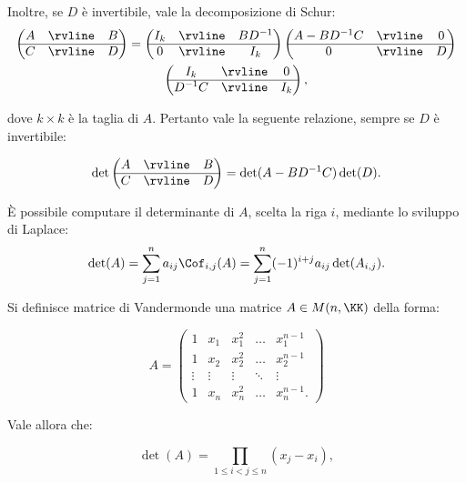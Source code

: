 \documentclass[10pt,landscape]{article}
\begin{document}
\begin{multicols}{3}
		Inoltre, se $D$ è invertibile, vale la decomposizione di Schur:
		\setlength{\extrarowheight}{1.3pt}
		\begin{gather*}
			\begin{pmatrix}
				A
				& \rvline & B \\
				\hline
				C & \rvline &
				D
			\end{pmatrix} = \begin{pmatrix}
				I_k
				& \rvline & BD^{-1} \\
				\hline
				0 & \rvline &
				I_k
			\end{pmatrix}
			\begin{pmatrix}
				A-BD^{-1}C
				& \rvline & 0 \\
				\hline
				0 & \rvline &
				D
			\end{pmatrix} \\
			\begin{pmatrix}
				I_k
				& \rvline & 0 \\
				\hline
				D^{-1}C & \rvline &
				I_k
			\end{pmatrix},
		\end{gather*}
		\setlength{\extrarowheight}{0pt}
		
		dove $k \times k$ è la taglia di $A$. Pertanto vale
		la seguente relazione, sempre se $D$ è invertibile:
		
		\[ \det \begin{pmatrix}
			A
			& \rvline & B \\
			\hline
			C & \rvline &
			D
		\end{pmatrix} = \det(A-BD^{-1}C)\det(D). \]
		
		È possibile computare il determinante di $A$, scelta la riga $i$, mediante lo
		sviluppo di Laplace:
		\[ \det(A) = \sum_{j=1}^n a_{ij} \Cof_{i,j}(A) = \sum_{j=1}^n (-1)^{i+j} a_{ij} \det(A_{i,j}). \]
		
		Si definisce matrice di Vandermonde una matrice $A \in M(n, \KK)$ della
		forma:
		
		\[ A = \begin{pmatrix}
			1 & x_1 & x_1^2 & \dots & x_1^{n-1}\\
			1 & x_2 & x_2^2 & \dots & x_2^{n-1}\\
			\vdots & \vdots & \vdots & \ddots &\vdots \\
			1 & x_n & x_n^2 & \dots & x_n^{n-1}.
		\end{pmatrix} \]
		
		Vale allora che:
		
		\[ \det(A) = \prod_{1 \leq i < j \leq n} (x_j - x_i), \]
		

\end{multicols}
\end{document}
